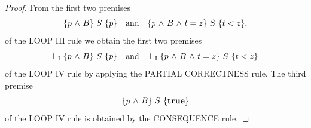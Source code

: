 \documentclass[runningheads]{llncs}       %
\begin{document}
\begin{proof}
From the first two premises
\[
  \mbox{$\{{p \mbox{$\ \wedge\ $} B}\}\ {S}\ \{{p}\}$}
\quad
\mbox{\rm and} \quad
   \mbox{$\{{p \mbox{$\ \wedge\ $} B \mbox{$\ \wedge\ $} t=z}\}\ {S}\ \{{t<z}\}$},
\]
of the LOOP III rule
we obtain the first two premises
$$\vdash_{\rm{I}}  \mbox{$\{{p \mbox{$\ \wedge\ $} B}\}\ {S}\ \{{p}\}$}
\quad
\mbox{\rm and} \quad \vdash_{\rm{I}}  \mbox{$\{{p \mbox{$\ \wedge\ $} B \mbox{$\ \wedge\ $} t=z}\}\ {S}\ \{{t<z}\}$}$$
of the LOOP IV rule
by applying the PARTIAL CORRECTNESS rule.
The third premise
\[
  \mbox{$\{{p \mbox{$\ \wedge\ $} B}\}\ {S}\ \{{\mathbf{true}}\}$}
\]
of the LOOP IV rule is obtained by the CONSEQUENCE rule.
\HB




\end{proof}
\end{document}
